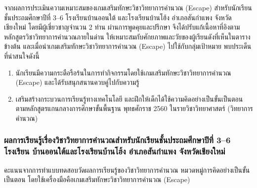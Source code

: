 จากผลการประเมินความเหมาะสมของเกมเสริมทักษะวิชาวิทยาการคำนวณ (Escape) สำหรับนักเรียนชั้นประถมศึกษาปีที่ 
3--6 โรงเรียนบ้านออนใต้ และโรงเรียนบ้านโฮ้ง อำเภอสันกำแพง จังหวัดเชียงใหม่ 
โดยมีผู้เชี่ยวชาญจำนวน 2 ท่าน ผ่านการพูดคุยและปรึกษา จึงได้ปรับแก้เนื้อหาที่อิงตามหลักสูตรวิชาวิทยาการคำนวณภายในด่าน 
ให้เหมาะสมกับศักยภาพและวัยของผู้เรียนดังที่เห็นในตารางข้างต้น และเมื่อนำเกมเสริมทักษะวิชาวิทยาการคำนวณ (Escape) 
ไปใช้กับกลุ่มเป้าหมาย พบประเด็นที่น่าสนใจดังนี้

\begin{enumerate}
    \item นักเรียนมีความกระตือรือร้นในการทำกิจกรรมโดยใช้เกมเสริมทักษะวิชาวิทยาการคำนวณ (Escape) และได้รับสนุกสนานควบคู่ไปกับความรู้ 
    \item เสริมสร้างกระบวนการเรียนรู้ทางเทคโนโลยี และฝึกให้เด็กได้ใช้ความคิดอย่างเป็นขั้นเป็นตอน ตามหลักสูตรแกนกลางการศึกษาขั้นพื้นฐาน พุทธศักราช 2560 ในรายวิชาวิทยาศาสตร์ (วิทยาการคำนวณ)
\end{enumerate}

\subsubsection{ผลการเรียนรู้เรื่องวิชาวิทยาการคำนวณสำหรับนักเรียนชั้นประถมศึกษาปีที่ 3--6 โรงเรียน บ้านออนใต้และโรงเรียนบ้านโฮ้ง อำเภอสันกำแพง จังหวัดเชียงใหม่}

คะแนนจากการทำแบบทดสอบวัดผลการเรียนรู้ของวิชาวิทยาการคำนวณ หมวดหมู่การคิดอย่างเป็นขั้นเป็นตอน โดยใช้เครื่องมือคือเกมเสริมทักษะวิชาวิทยาการคำนวณ (Escape)
\begin{center}
\end{center}

